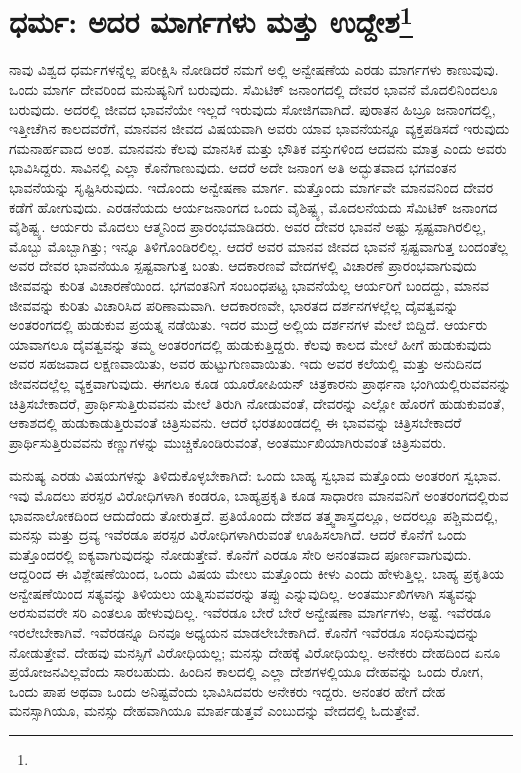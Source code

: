 
\chapter{ಧರ್ಮ: ಅದರ ಮಾರ್ಗಗಳು ಮತ್ತು ಉದ್ದೇಶ\protect\footnote{}}

ನಾವು ವಿಶ್ವದ ಧರ್ಮಗಳನ್ನೆಲ್ಲ ಪರೀಕ್ಷಿಸಿ ನೋಡಿದರೆ ನಮಗೆ ಅಲ್ಲಿ ಅನ್ವೇಷಣೆಯ ಎರಡು ಮಾರ್ಗಗಳು ಕಾಣುವುವು. ಒಂದು ಮಾರ್ಗ ದೇವರಿಂದ ಮನುಷ್ಯನಿಗೆ ಬರುವುದು. ಸೆಮಿಟಿಕ್ ಜನಾಂಗದಲ್ಲಿ ದೇವರ ಭಾವನೆ ಮೊದಲಿನಿಂದಲೂ ಬರುವುದು. ಅದರಲ್ಲಿ ಜೀವದ ಭಾವನೆಯೇ ಇಲ್ಲದೆ ಇರುವುದು ಸೋಜಿಗವಾಗಿದೆ. ಪುರಾತನ ಹಿಬ್ರೂ ಜನಾಂಗದಲ್ಲಿ, ಇತ್ತೀಚೆಗಿನ ಕಾಲದವರೆಗೆ, ಮಾನವನ ಜೀವದ ವಿಷಯವಾಗಿ ಅವರು ಯಾವ ಭಾವನೆಯನ್ನೂ ವ್ಯಕ್ತಪಡಿಸದೆ ಇರುವುದು ಗಮನಾರ್ಹವಾದ ಅಂಶ. ಮಾನವನು ಕೆಲವು ಮಾನಸಿಕ ಮತ್ತು ಭೌತಿಕ ವಸ್ತುಗಳಿಂದ ಆದವನು ಮಾತ್ರ ಎಂದು ಅವರು ಭಾವಿಸಿದ್ದರು. ಸಾವಿನಲ್ಲಿ ಎಲ್ಲಾ ಕೊನೆಗಾಣುವುದು. ಆದರೆ ಅದೇ ಜನಾಂಗ ಅತಿ ಅದ್ಭುತವಾದ ಭಗವಂತನ ಭಾವನೆಯನ್ನು ಸೃಷ್ಟಿಸಿರುವುದು. ಇದೊಂದು ಅನ್ವೇಷಣಾ ಮಾರ್ಗ. ಮತ್ತೊಂದು ಮಾರ್ಗವೇ ಮಾನವನಿಂದ ದೇವರ ಕಡೆಗೆ ಹೋಗುವುದು. ಎರಡನೆಯದು ಆರ್ಯಜನಾಂಗದ ಒಂದು ವೈಶಿಷ್ಟ್ಯ, ಮೊದಲನೆಯದು ಸೆಮಿಟಿಕ್ ಜನಾಂಗದ ವೈಶಿಷ್ಟ್ಯ. ಆರ್ಯರು ಮೊದಲು ಆತ್ಮನಿಂದ ಪ್ರಾರಂಭಮಾಡಿದರು. ಅವರ ದೇವರ ಭಾವನೆ ಅಷ್ಟು ಸ್ಪಷ್ಟವಾಗಿರಲಿಲ್ಲ, ಮೊಬ್ಬು ಮೊಬ್ಬಾಗಿತ್ತು; ಇನ್ನೂ ತಿಳಿಗೊಂಡಿರಲಿಲ್ಲ. ಆದರೆ ಅವರ ಮಾನವ ಜೀವದ ಭಾವನೆ ಸ್ಪಷ್ಟವಾಗುತ್ತ ಬಂದಂತೆಲ್ಲ ಅವರ ದೇವರ ಭಾವನೆಯೂ ಸ್ಪಷ್ಟವಾಗುತ್ತ ಬಂತು. ಆದಕಾರಣವೆ ವೇದಗಳಲ್ಲಿ ವಿಚಾರಣೆ ಪ್ರಾರಂಭವಾಗುವುದು ಜೀವವನ್ನು ಕುರಿತ ವಿಚಾರಣೆಯಿಂದ. ಭಗವಂತನಿಗೆ ಸಂಬಂಧಪಟ್ಟ ಭಾವನೆಯೆಲ್ಲ ಆರ್ಯರಿಗೆ ಬಂದದ್ದು, ಮಾನವ ಜೀವವನ್ನು ಕುರಿತು ವಿಚಾರಿಸಿದ ಪರಿಣಾಮವಾಗಿ. ಆದಕಾರಣವೇ, ಭಾರತದ ದರ್ಶನಗಳಲ್ಲೆಲ್ಲ ದೈವತ್ವವನ್ನು ಅಂತರಂಗದಲ್ಲಿ ಹುಡುಕುವ ಪ್ರಯತ್ನ ನಡೆಯಿತು. ಇದರ ಮುದ್ರೆ ಅಲ್ಲಿಯ ದರ್ಶನಗಳ ಮೇಲೆ ಬಿದ್ದಿದೆ. ಆರ್ಯರು ಯಾವಾಗಲೂ ದೈವತ್ವವನ್ನು ತಮ್ಮ ಅಂತರಂಗದಲ್ಲಿ ಹುಡುಕುತ್ತಿದ್ದರು. ಕೆಲವು ಕಾಲದ ಮೇಲೆ ಹೀಗೆ ಹುಡುಕುವುದು ಅವರ ಸಹಜವಾದ ಲಕ್ಷಣವಾಯಿತು, ಅವರ ಹುಟ್ಟುಗುಣವಾಯಿತು. ಇದು ಅವರ ಕಲೆಯಲ್ಲಿ ಮತ್ತು ಅನುದಿನದ ಜೀವನದಲ್ಲೆಲ್ಲ ವ್ಯಕ್ತವಾಗುವುದು. ಈಗಲೂ ಕೂಡ ಯೂರೋಪಿಯನ್ ಚಿತ್ರಕಾರನು ಪ್ರಾರ್ಥನಾ ಭಂಗಿಯಲ್ಲಿರುವವನನ್ನು ಚಿತ್ರಿಸಬೇಕಾದರೆ, ಪ್ರಾರ್ಥಿಸುತ್ತಿರುವವನು ಮೇಲೆ ತಿರುಗಿ ನೋಡುವಂತೆ, ದೇವರನ್ನು ಎಲ್ಲೋ ಹೊರಗೆ ಹುಡುಕುವಂತೆ, ಆಕಾಶದಲ್ಲಿ ಹುಡುಕಾಡುತ್ತಿರುವಂತೆ ಚಿತ್ರಿಸುವನು. ಆದರೆ ಭರತಖಂಡದಲ್ಲಿ ಈ ಭಾವವನ್ನು ಚಿತ್ರಿಸಬೇಕಾದರೆ ಪ್ರಾರ್ಥಿಸುತ್ತಿರುವವನು ಕಣ್ಣುಗಳನ್ನು ಮುಚ್ಚಿಕೊಂಡಿರುವಂತೆ, ಅಂತರ್ಮುಖಿಯಾಗಿರುವಂತೆ ಚಿತ್ರಿಸುವರು.

ಮನುಷ್ಯ ಎರಡು ವಿಷಯಗಳನ್ನು ತಿಳಿದುಕೊಳ್ಳಬೇಕಾಗಿದೆ: ಒಂದು ಬಾಹ್ಯ ಸ್ವಭಾವ ಮತ್ತೊಂದು ಅಂತರಂಗ ಸ್ವಭಾವ. ಇವು ಮೊದಲು ಪರಸ್ಪರ ವಿರೋಧಿಗಳಾಗಿ ಕಂಡರೂ, ಬಾಹ್ಯಪ್ರಕೃತಿ ಕೂಡ ಸಾಧಾರಣ ಮಾನವನಿಗೆ ಅಂತರಂಗದಲ್ಲಿರುವ ಭಾವನಾಲೋಕದಿಂದ ಆದುದೆಂದು ತೋರುತ್ತದೆ. ಪ್ರತಿಯೊಂದು ದೇಶದ ತತ್ತ್ವಶಾಸ್ತ್ರದಲ್ಲೂ, ಅದರಲ್ಲೂ ಪಶ್ಚಿಮದಲ್ಲಿ, ಮನಸ್ಸು ಮತ್ತು ದ್ರವ್ಯ ಇವೆರಡೂ ಪರಸ್ಪರ ವಿರೋಧಿಗಳಾಗಿರುವಂತೆ ಊಹಿಸಲಾಗಿದೆ. ಆದರೆ ಕೊನೆಗೆ ಒಂದು ಮತ್ತೊಂದರಲ್ಲಿ ಐಕ್ಯವಾಗುವುದನ್ನು ನೋಡುತ್ತೇವೆ. ಕೊನೆಗೆ ಎರಡೂ ಸೇರಿ ಅನಂತವಾದ ಪೂರ್ಣವಾಗುವುದು. ಆದ್ದರಿಂದ ಈ ವಿಶ್ಲೇಷಣೆಯಿಂದ, ಒಂದು ವಿಷಯ ಮೇಲು ಮತ್ತೊಂದು ಕೀಳು ಎಂದು ಹೇಳುತ್ತಿಲ್ಲ. ಬಾಹ್ಯ ಪ್ರಕೃತಿಯ ಅನ್ವೇಷಣೆಯಿಂದ ಸತ್ಯವನ್ನು ತಿಳಿಯಲು ಯತ್ನಿಸುವವರನ್ನು ತಪ್ಪು ಎನ್ನುವುದಿಲ್ಲ. ಅಂತರ್ಮುಖಿಗಳಾಗಿ ಸತ್ಯವನ್ನು ಅರಸುವವರೇ ಸರಿ ಎಂತಲೂ ಹೇಳುವುದಿಲ್ಲ. ಇವೆರಡೂ ಬೇರೆ ಬೇರೆ ಅನ್ವೇಷಣಾ ಮಾರ್ಗಗಳು, ಅಷ್ಟೆ. ಇವೆರಡೂ ಇರಲೇಬೇಕಾಗಿವೆ. ಇವೆರಡನ್ನೂ ದಿನವೂ ಅಧ್ಯಯನ ಮಾಡಲೇಬೇಕಾಗಿದೆ. ಕೊನೆಗೆ ಇವೆರಡೂ ಸಂಧಿಸುವುದನ್ನು ನೋಡುತ್ತೇವೆ. ದೇಹವು ಮನಸ್ಸಿಗೆ ವಿರೋಧಿಯಲ್ಲ; ಮನಸ್ಸು ದೇಹಕ್ಕೆ ವಿರೋಧಿಯಲ್ಲ. ಅನೇಕರು ದೇಹದಿಂದ ಏನೂ ಪ್ರಯೋಜನವಿಲ್ಲವೆಂದು ಸಾರಬಹುದು. ಹಿಂದಿನ ಕಾಲದಲ್ಲಿ ಎಲ್ಲಾ ದೇಶಗಳಲ್ಲಿಯೂ ದೇಹವನ್ನು ಒಂದು ರೋಗ, ಒಂದು ಪಾಪ ಅಥವಾ ಒಂದು ಅನಿಷ್ಟವೆಂದು ಭಾವಿಸಿದವರು ಅನೇಕರು ಇದ್ದರು. ಅನಂತರ ಹೇಗೆ ದೇಹ ಮನಸ್ಸಾಗಿಯೂ, ಮನಸ್ಸು ದೇಹವಾಗಿಯೂ ಮಾರ್ಪಡುತ್ತವೆ ಎಂಬುದನ್ನು ವೇದದಲ್ಲಿ ಓದುತ್ತೇವೆ.


